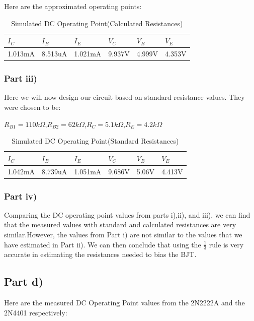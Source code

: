 \documentclass[12pt]{article}
\begin{document}
Here are the approximated operating points:
\begin{table}[h!]
\centering
\begin{tabular}{|l|l|l|l|l|l|}
\cline{1-6}
$I_C$      & $I_B$      & $I_E$      & $V_C$     & $V_B$     & $V_E$     \\ \cline{1-6}
\hline
1.013mA & 8.513uA & 1.021mA & 9.937V & 4.999V & 4.353V \\ 
\hline
\end{tabular}
\caption{Simulated DC Operating Point(Calculated Resistances)}
\label{table:DC Operating Values}
\end{table}
\subsubsection{Part iii)}
Here we will now design our circuit based on standard resistance values. They were chosen to be:
\begin{center}
    $R_{B1}=110k\Omega$,$R_{B2}=62k\Omega$,$R_{C}=5.1k\Omega$,$R_{E}=4.2k\Omega$
\end{center}
\begin{table}[h!]
\centering
\begin{tabular}{|l|l|l|l|l|l|}
\cline{1-6}
$I_C$      & $I_B$      & $I_E$      & $V_C$     & $V_B$     & $V_E$     \\ \cline{1-6}
\hline
1.042mA & 8.739uA & 1.051mA & 9.686V & 5.06V & 4.413V \\ 
\hline
\end{tabular}
\caption{Simulated DC Operating Point(Standard Resistances)}
\label{table:DC Standard Operating Values}
\end{table}
\subsubsection{Part iv)}
Comparing the DC operating point values from parts i),ii), and iii), we can find that the measured values with standard and calculated resistances are very similar.However, the values from Part i) are not similar to the values that we have estimated in Part ii). We can then conclude that using the $\frac{1}{3}$ rule is very accurate in estimating the resistances needed to bias the BJT.  
\subsection{Part d)}
\FloatBarrier
Here are the measured DC Operating Point values from the 2N2222A and the 2N4401 respectively:
\end{document}
